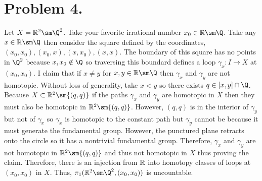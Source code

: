 \documentclass[12pt]{extarticle}
\begin{document}
\section*{Problem 4.}

Let $X = \R^2 \sm \Q^2$. Take your favorite irrational number $x_0 \in \R \sm \Q$. Take any $x \in \R \sm \Q$ then consider the square defined by the coordinates, $(x_0, x_0), (x_0, x), (x, x_0), (x, x)$. The boundary of this square has no points in $\Q^2$ because $x, x_0 \notin \Q$ so traversing this boundard defines a loop $\gamma_x : I \to X$ at $(x_0, x_0)$. I claim that if $x \neq y$ for $x, y \in \R \sm \Q$ then $\gamma_x$ and $\gamma_y$ are not homotopic. Without loss of generality, take $x < y$ so there exists $q \in [x, y] \cap \Q$. Because $X \subset \R^2 \sm \{(q, q)\}$ if the paths $\gamma_x$ and $\gamma_y$ are homotopic in $X$ then they must also be homotopic in $\R^2 \sm \{(q, q)\}$. However, $(q, q)$ is in the interior of $\gamma_y$ but not of $\gamma_x$ so $\gamma_x$ is homotopic to the constant path but $\gamma_y$ cannot be because it must generate the fundamental group. However, the punctured plane retracts onto the circle so it has a nontrivial fundamental group. Therefore, $\gamma_x$ and $\gamma_y$ are not homotopic in $\R^2 \sm \{(q, q)\}$ and thus not homotopic in $X$ thus proving the claim. Therefore, there is an injection from $\mathbb{R}$ into homotopy classes of loops at $(x_0, x_0)$ in $X$. Thus, $\pi_1(\R^2 \sm \Q^2, (x_0, x_0))$ is uncountable. 
\end{document}
